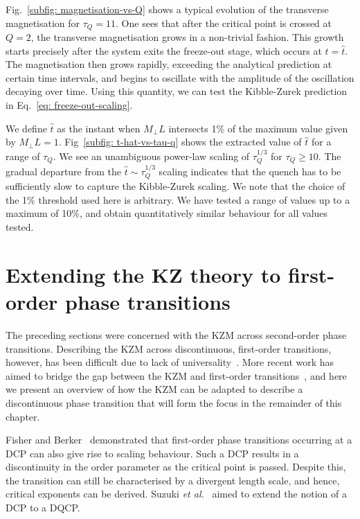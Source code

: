 Fig.~\ref{subfig: magnetisation-vs-Q} shows a typical evolution of the
transverse magnetisation for \(\tau_Q = 11\).
One sees that after the critical point is crossed at \( Q = 2 \), the transverse
magnetisation grows in a non-trivial fashion.
This growth starts precisely after the system exits the freeze-out stage, which
occurs at \(t=\hat{t}\).
The magnetisation then grows rapidly, exceeding the analytical prediction at
certain time intervals, and begins to oscillate with the amplitude of the
oscillation decaying over time.
Using this quantity, we can test the Kibble-Zurek prediction in
Eq.~\eqref{eq: freeze-out-scaling}.

We define \( \hat{t} \) as the instant when \(M_\perp L\) intersects 1\% of the
maximum value given by \(M_\perp L = 1\).
Fig~\ref{subfig: t-hat-vs-tau-q} shows the extracted value of \( \hat{t} \) for
a range of \( \tau_Q \).
We see an unambiguous power-law scaling of \(\tau_Q^{1/3}\) for
\(\tau_Q \geq 10\).
The gradual departure from the \(\hat{t} \sim \tau_Q^{1/3}\) scaling indicates
that the quench has to be sufficiently slow to capture the Kibble-Zurek scaling.
We note that the choice of the 1\% threshold used here is arbitrary.
We have tested a range of values up to a maximum of 10\%, and obtain
quantitatively similar behaviour for all values tested.

\section{Extending the KZ theory to first-order phase transitions}
The preceding sections were concerned with the KZM across second-order phase
transitions.
Describing the KZM across discontinuous, first-order transitions, however, has
been difficult due to lack of
universality~\cite{Turban2002,Continentino2004,Nauenberg1975}.
More recent work has aimed to bridge the gap between the KZM and first-order
transitions~\cite{Suzuki2015}, and here we present an overview of how the KZM
can be adapted to describe a discontinuous phase transition that will form the
focus in the remainder of this chapter.

Fisher and Berker~\cite{Fisher1982} demonstrated that first-order phase
transitions occurring at a DCP can also give rise to scaling behaviour.
Such a DCP results in a discontinuity in the order parameter as the critical
point is passed.
Despite this, the transition can still be characterised by a divergent length
scale, and hence, critical exponents can be derived.
Suzuki \textit{et al.}~\cite{Suzuki2015} aimed to extend the notion of a DCP to
a DQCP\@.

